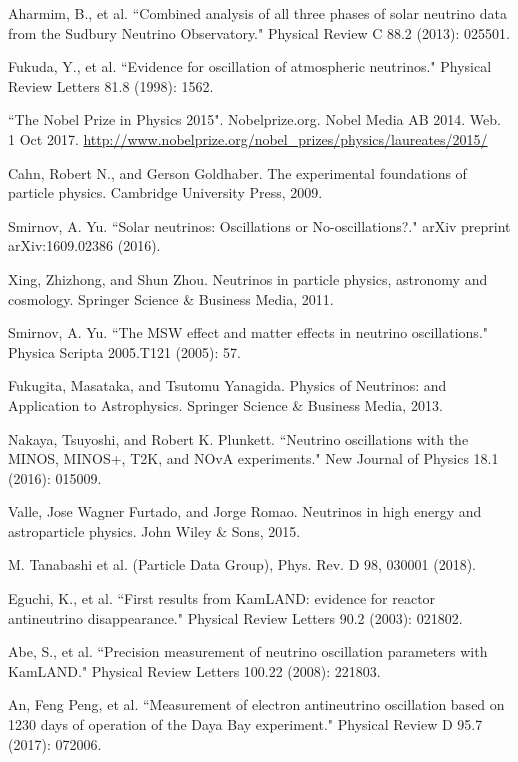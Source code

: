\documentclass[preprint,12pt]{elsarticle}
\numberwithin{equation}{section}
\begin{document}
\begin{thebibliography}{00}
	 Aharmim, B., et al. ``Combined analysis of all three phases of solar neutrino data from the Sudbury Neutrino Observatory." Physical Review C 88.2 (2013): 025501.
	
	 Fukuda, Y., et al. ``Evidence for oscillation of atmospheric neutrinos." Physical Review Letters 81.8 (1998): 1562.
	
	 ``The Nobel Prize in Physics 2015". Nobelprize.org. Nobel Media AB 2014. Web. 1 Oct 2017. \url{http://www.nobelprize.org/nobel_prizes/physics/laureates/2015/}
	
	 Cahn, Robert N., and Gerson Goldhaber. The experimental foundations of particle physics. Cambridge University Press, 2009.
	
	 Smirnov, A. Yu. ``Solar neutrinos: Oscillations or No-oscillations?." arXiv preprint arXiv:1609.02386 (2016).
	
	 Xing, Zhizhong, and Shun Zhou. Neutrinos in particle physics, astronomy and cosmology. Springer Science \& Business Media, 2011.
	
	 Smirnov, A. Yu. ``The MSW effect and matter effects in neutrino oscillations." Physica Scripta 2005.T121 (2005): 57.
	
	 Fukugita, Masataka, and Tsutomu Yanagida. Physics of Neutrinos: and Application to Astrophysics. Springer Science \& Business Media, 2013.
	
	 Nakaya, Tsuyoshi, and Robert K. Plunkett. ``Neutrino oscillations with the MINOS, MINOS+, T2K, and NOvA experiments." New Journal of Physics 18.1 (2016): 015009.
	
	 Valle, Jose Wagner Furtado, and Jorge Romao. Neutrinos in high energy and astroparticle physics. John Wiley \& Sons, 2015.
	
	 M. Tanabashi et al. (Particle Data Group), Phys. Rev. D 98, 030001 (2018).
	
	 Eguchi, K., et al. ``First results from KamLAND: evidence for reactor antineutrino disappearance." Physical Review Letters 90.2 (2003): 021802.
	
	 Abe, S., et al. ``Precision measurement of neutrino oscillation parameters with KamLAND." Physical Review Letters 100.22 (2008): 221803.
	
	 An, Feng Peng, et al. ``Measurement of electron antineutrino oscillation based on 1230 days of operation of the Daya Bay experiment." Physical Review D 95.7 (2017): 072006.
	

\end{thebibliography}
\end{document}
